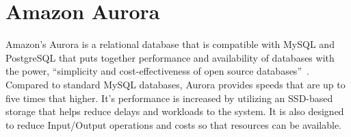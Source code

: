\section{Amazon Aurora}

Amazon's Aurora is a relational database that is compatible with MySQL and PostgreSQL that puts together performance and availability of databases with the power, ``simplicity and cost-effectiveness of open source databases''~\cite{hid-sp18-512-amazon-aurora}. Compared to standard MySQL databases, Aurora provides speeds that are up to five times that higher. It's performance is increased by utilizing an SSD-based storage that helps reduce delays and workloads to the system. It is also designed to reduce Input/Output operations and costs so that resources can be available.  
